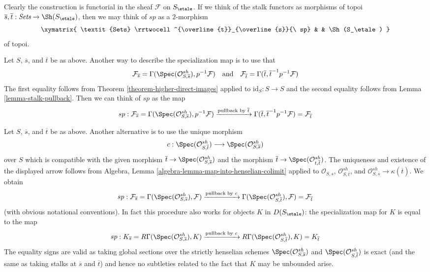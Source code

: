 \medskip\noindent
Clearly the construction is functorial in the sheaf $\mathcal{F}$ on
$S_\etale$. If we think of the stalk functors as morphisms of topoi
$\overline{s}, \overline{t} : \textit{Sets} \to \Sh(S_\etale)$, then
we may think of $sp$ as a $2$-morphism
$$
\xymatrix{
\textit{Sets}
\rrtwocell^{\overline{t}}_{\overline{s}}{\ sp}
&
&
\Sh(S_\etale)
}
$$
of topoi.

\begin{remark}
\label{remark-alternative-sp}
Let $S$, $\overline{s}$, and $\overline{t}$ be as above.
Another way to describe the specialization map is to use that
$$
\mathcal{F}_{\overline{s}} =
\Gamma(\Spec(\mathcal{O}^{sh}_{S, \overline{s}}), p^{-1}\mathcal{F})
\quad\text{and}\quad
\mathcal{F}_{\overline{t}} = \Gamma(\overline{t},
\overline{t}^{-1}p^{-1}\mathcal{F})
$$
The first equality follows from Theorem \ref{theorem-higher-direct-images}
applied to $\text{id}_S : S \to S$ and the second equality follows
from Lemma \ref{lemma-stalk-pullback}. Then we can think of $sp$
as the map
$$
sp :
\mathcal{F}_{\overline{s}} =
\Gamma(\Spec(\mathcal{O}^{sh}_{S, \overline{s}}), p^{-1}\mathcal{F})
\xrightarrow{\text{pullback by }\overline{t}}
\Gamma(\overline{t}, \overline{t}^{-1}p^{-1}\mathcal{F}) =
\mathcal{F}_{\overline{t}}
$$
\end{remark}

\begin{remark}
\label{remark-another-sp}
Let $S$, $\overline{s}$, and $\overline{t}$ be as above.
Another alternative is to use the unique morphism
$$
c :
\Spec(\mathcal{O}^{sh}_{S, \overline{t}})
\longrightarrow
\Spec(\mathcal{O}^{sh}_{S, \overline{s}})
$$
over $S$ which is compatible with the given morphism
$\overline{t} \to \Spec(\mathcal{O}^{sh}_{S, \overline{s}})$
and the morphism
$\overline{t} \to \Spec(\mathcal{O}^{sh}_{t, \overline{t}})$.
The uniqueness and existence of the displayed arrow
follows from Algebra, Lemma \ref{algebra-lemma-map-into-henselian-colimit}
applied to $\mathcal{O}_{S, s}$, $\mathcal{O}^{sh}_{S, \overline{t}}$, and
$\mathcal{O}^{sh}_{S, \overline{s}} \to \kappa(\overline{t})$.
We obtain
$$
sp :
\mathcal{F}_{\overline{s}} =
\Gamma(\Spec(\mathcal{O}^{sh}_{S, \overline{s}}), \mathcal{F})
\xrightarrow{\text{pullback by }c}
\Gamma(\Spec(\mathcal{O}^{sh}_{S, \overline{t}}), \mathcal{F}) =
\mathcal{F}_{\overline{t}}
$$
(with obvious notational conventions).
In fact this procedure also works for objects $K$ in $D(S_\etale)$:
the specialization map for $K$ is equal to the map
$$
sp :
K_{\overline{s}} =
R\Gamma(\Spec(\mathcal{O}^{sh}_{S, \overline{s}}), K)
\xrightarrow{\text{pullback by }c}
R\Gamma(\Spec(\mathcal{O}^{sh}_{S, \overline{t}}), K) =
K_{\overline{t}}
$$
The equality signs are valid as taking global sections over
the strictly henselian schemes
$\Spec(\mathcal{O}^{sh}_{S, \overline{s}})$ and
$\Spec(\mathcal{O}^{sh}_{S, \overline{t}})$
is exact (and the same as taking stalks at $\overline{s}$ and $\overline{t}$)
and hence no subtleties related to the fact that $K$ may be unbounded
arise.
\end{remark}

